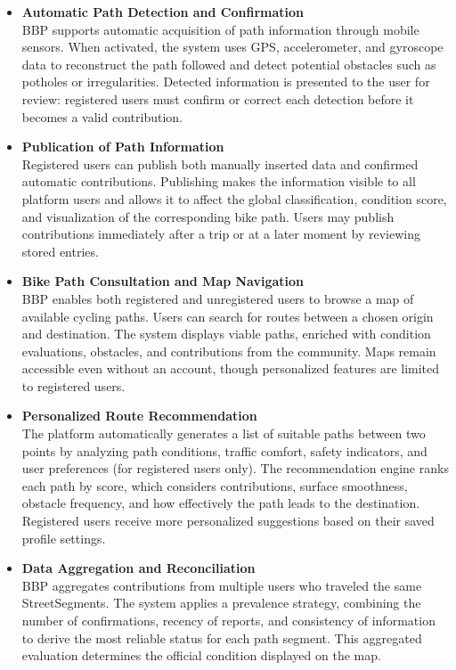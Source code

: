 \begin{itemize}
    \item \textbf{Automatic Path Detection and Confirmation}\\
    BBP supports automatic acquisition of path information through mobile sensors.
    When activated, the system uses GPS, accelerometer, and gyroscope data to reconstruct the path followed and detect potential obstacles such as potholes or irregularities. Detected information is presented to the user for review: registered users must confirm or correct each detection before it becomes a valid contribution.

    \item \textbf{Publication of Path Information}\\
    Registered users can publish both manually inserted data and confirmed automatic contributions.
    Publishing makes the information visible to all platform users and allows it to affect the global classification, condition score, and visualization of the corresponding bike path. Users may publish contributions immediately after a trip or at a later moment by reviewing stored entries.

    \item \textbf{Bike Path Consultation and Map Navigation}\\
    BBP enables both registered and unregistered users to browse a map of available cycling paths.
    Users can search for routes between a chosen origin and destination. The system displays viable paths, enriched with condition evaluations, obstacles, and contributions from the community. Maps remain accessible even without an account, though personalized features are limited to registered users.

    \item \textbf{Personalized Route Recommendation}\\
    The platform automatically generates a list of suitable paths between two points by analyzing path conditions, traffic comfort, safety indicators, and user preferences (for registered users only).
    The recommendation engine ranks each path by score, which considers contributions, surface smoothness, obstacle frequency, and how effectively the path leads to the destination. Registered users receive more personalized suggestions based on their saved profile settings.

    \item \textbf{Data Aggregation and Reconciliation}\\
    BBP aggregates contributions from multiple users who traveled the same StreetSegments.
    The system applies a prevalence strategy, combining the number of confirmations, recency of reports, and consistency of information to derive the most reliable status for each path segment. This aggregated evaluation determines the official condition displayed on the map.


\end{itemize}
